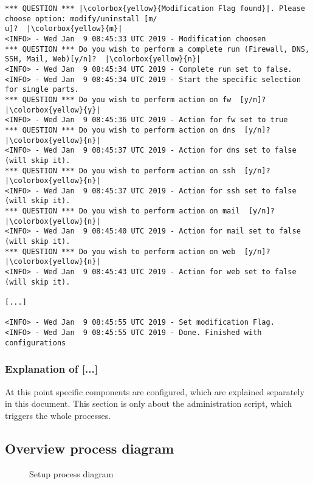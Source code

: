 \begin{lstlisting}[escapeinside=||]
*** QUESTION *** |\colorbox{yellow}{Modification Flag found}|. Please choose option: modify/uninstall [m/
u]?  |\colorbox{yellow}{m}|
<INFO> - Wed Jan  9 08:45:33 UTC 2019 - Modification choosen
*** QUESTION *** Do you wish to perform a complete run (Firewall, DNS, SSH, Mail, Web)[y/n]?  |\colorbox{yellow}{n}|
<INFO> - Wed Jan  9 08:45:34 UTC 2019 - Complete run set to false.
<INFO> - Wed Jan  9 08:45:34 UTC 2019 - Start the specific selection for single parts.
*** QUESTION *** Do you wish to perform action on fw  [y/n]?  |\colorbox{yellow}{y}|
<INFO> - Wed Jan  9 08:45:36 UTC 2019 - Action for fw set to true
*** QUESTION *** Do you wish to perform action on dns  [y/n]? |\colorbox{yellow}{n}|
<INFO> - Wed Jan  9 08:45:37 UTC 2019 - Action for dns set to false (will skip it).
*** QUESTION *** Do you wish to perform action on ssh  [y/n]?  |\colorbox{yellow}{n}|
<INFO> - Wed Jan  9 08:45:37 UTC 2019 - Action for ssh set to false (will skip it).
*** QUESTION *** Do you wish to perform action on mail  [y/n]?  |\colorbox{yellow}{n}|
<INFO> - Wed Jan  9 08:45:40 UTC 2019 - Action for mail set to false (will skip it).
*** QUESTION *** Do you wish to perform action on web  [y/n]?  |\colorbox{yellow}{n}|
<INFO> - Wed Jan  9 08:45:43 UTC 2019 - Action for web set to false (will skip it).

[...]

<INFO> - Wed Jan  9 08:45:55 UTC 2019 - Set modification Flag.
<INFO> - Wed Jan  9 08:45:55 UTC 2019 - Done. Finished with configurations
\end{lstlisting}

\subsubsection{Explanation of [...]} 
At this point specific components are configured, which are explained separately in this document. This section is only about the administration script, which triggers the whole processes.

\subsection{Overview process diagram}

\begin{figure}[H]
	\usetikzlibrary{shapes,arrows,calc}
	\centering
	
	\caption{Setup process diagram}
\end{figure}
\newpage
